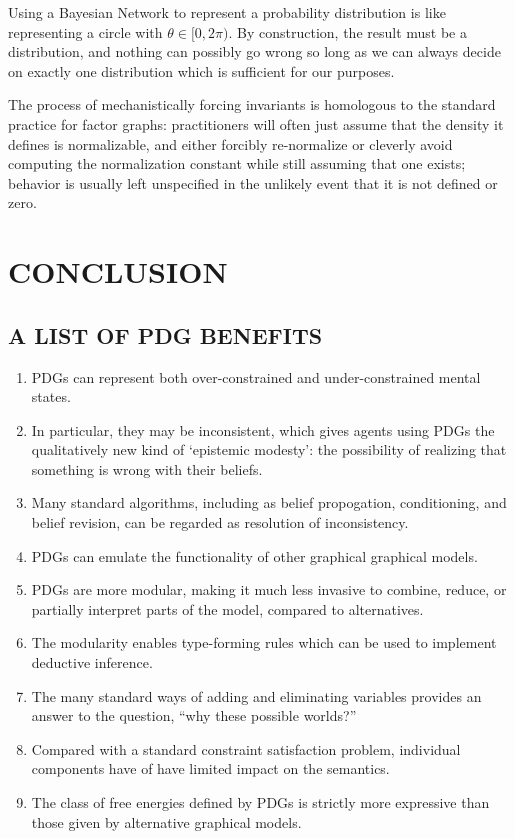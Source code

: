 \documentclass{article}
\numberwithin{equation}{section}
\begin{document}
\begin{vfull}
		Using a Bayesian Network to represent a probability distribution is like representing a circle with $\theta \in [0, 2\pi)$.
		By construction, the result must be a distribution, and nothing can possibly go wrong so long as we can always decide on exactly one distribution which is sufficient for our purposes.
		
		
		The process of mechanistically forcing invariants is homologous to the standard practice for factor graphs: practitioners will often just assume that the density it defines is normalizable, and either forcibly re-normalize or cleverly avoid computing the normalization constant while still assuming that one exists; behavior is usually left unspecified in the unlikely event that it is not defined or zero.
	\end{vfull}
	
	\section{CONCLUSION}
	\subsection{A LIST OF PDG BENEFITS}\label{sec:list-of-benefits}
	\begin{enumerate}[nosep]
		\item PDGs can represent both over-constrained and under-constrained mental states. 
		\item In particular, they may be inconsistent, which gives agents using PDGs the qualitatively new kind of `epistemic modesty': the possibility of realizing that something is wrong with their beliefs.
		\item Many standard algorithms, including as belief propogation, conditioning, and belief revision, can be regarded as resolution of inconsistency.
		\item PDGs can emulate the functionality of other graphical graphical models.
		\item PDGs are more modular, making it much less invasive to combine, reduce, or partially interpret parts of the model, compared to alternatives.
		\item The modularity enables type-forming rules which can be used to implement deductive inference.
		\item The many standard ways of adding and eliminating variables provides an answer to the question, ``why these possible worlds?''
		\item Compared with a standard constraint satisfaction problem, individual components have of have limited impact on the semantics.
		\item The class of free energies defined by PDGs is strictly more expressive than those given by alternative graphical models.
	\end{enumerate} %
	
\end{document}
